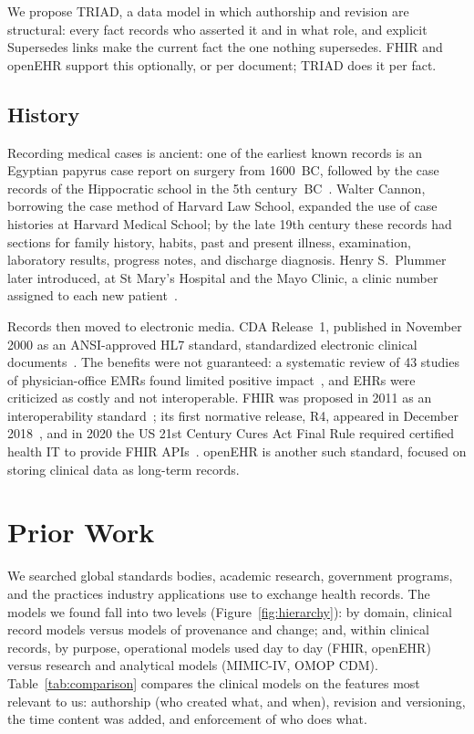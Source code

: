 \documentclass[sigconf]{acmart}
\begin{document}
We propose TRIAD, a data model in which authorship and revision are structural: every fact records who asserted it and in what role, and explicit Supersedes links make the current fact the one nothing supersedes. FHIR and openEHR support this optionally, or per document; TRIAD does it per fact.

\subsection{History}
Recording medical cases is ancient: one of the earliest known records is an
Egyptian papyrus case report on surgery from 1600~BC, followed by the case
records of the Hippocratic school in the 5th century~BC~\cite{gillum2013}.
Walter Cannon, borrowing the case method of Harvard Law School, expanded the
use of case histories at Harvard Medical School; by the late 19th century these
records had sections for family history, habits, past and present illness,
examination, laboratory results, progress notes, and discharge diagnosis.
Henry S.\ Plummer later introduced, at St Mary's Hospital and the Mayo Clinic,
a clinic number assigned to each new patient~\cite{gillum2013}.

Records then moved to electronic media. CDA Release~1, published in November
2000 as an ANSI-approved HL7 standard, standardized electronic clinical
documents~\cite{dolin2001}. The benefits were not guaranteed: a systematic
review of 43 studies of physician-office EMRs found limited positive
impact~\cite{lau2012}, and EHRs were criticized as costly and not
interoperable. FHIR was proposed in 2011 as an interoperability
standard~\cite{ayaz2021}; its first normative release, R4, appeared in
December 2018~\cite{hl7fhirhistory}, and in 2020 the US 21st Century Cures Act
Final Rule required certified health IT to provide FHIR APIs~\cite{cures2020}.
openEHR is another such standard, focused on storing clinical data as
long-term records.

\section{Prior Work}
We searched global standards bodies, academic research, government programs,
and the practices industry applications use to exchange health records. The
models we found fall into two levels (Figure~\ref{fig:hierarchy}): by domain,
clinical record models versus models of provenance and change; and, within
clinical records, by purpose, operational models used day to day (FHIR,
openEHR) versus research and analytical models (MIMIC-IV, OMOP CDM).
Table~\ref{tab:comparison} compares the clinical models on the features most
relevant to us: authorship (who created what, and when), revision and
versioning, the time content was added, and enforcement of who does what.
\end{document}
